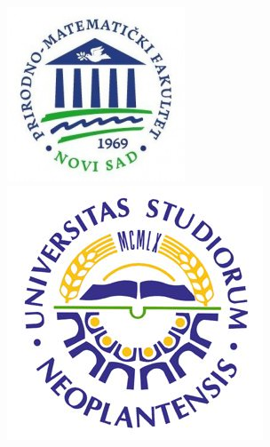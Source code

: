 \documentclass[12pt]{article}
\begin{document}
\clearpage

\begin{figure}[h]
\includegraphics[width=0.3\linewidth]{PMF.jpg}
\includegraphics[width=0.3\linewidth,right=10cm]{uns.jpg}
\end{figure}
\end{document}
